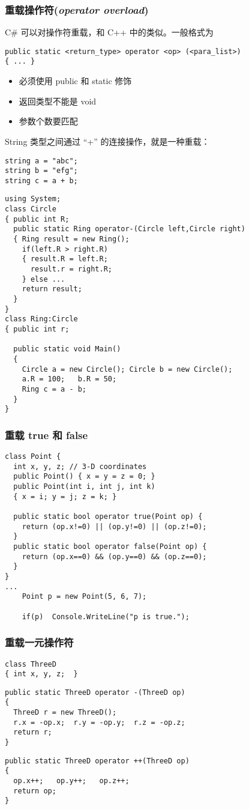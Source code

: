\begin{frame}[fragile]
\frametitle{重载操作符(\textit{operator overload})}
C\# 可以对操作符重载，和 C++ 中的类似。一般格式为
\begin{lstlisting}
public static <return_type> operator <op> (<para_list>)
{ ... }
\end{lstlisting}
\begin{itemize}
\item 必须使用 public 和 static 修饰
\item 返回类型不能是 void
\item 参数个数要匹配
\end{itemize}
String 类型之间通过 ``+'' 的连接操作，就是一种重载：
\begin{lstlisting}
string a = "abc";
string b = "efg";
string c = a + b;
\end{lstlisting}
\end{frame}

\begin{frame}
\begin{lstlisting}
using System;
class Circle
{ public int R;
  public static Ring operator-(Circle left,Circle right)
  { Ring result = new Ring();
    if(left.R > right.R)
    { result.R = left.R;
      result.r = right.R;
    } else ...
    return result;
  }
}
class Ring:Circle
{ public int r;

  public static void Main()
  {
    Circle a = new Circle(); Circle b = new Circle();
    a.R = 100;   b.R = 50;
    Ring c = a - b;
  }
}
\end{lstlisting}
\end{frame}

\begin{frame}[fragile]
\frametitle{重载 true 和 false}
\begin{lstlisting}
class Point {
  int x, y, z; // 3-D coordinates
  public Point() { x = y = z = 0; }
  public Point(int i, int j, int k)
  { x = i; y = j; z = k; }

  public static bool operator true(Point op) {
    return (op.x!=0) || (op.y!=0) || (op.z!=0);
  }
  public static bool operator false(Point op) {
    return (op.x==0) && (op.y==0) && (op.z==0);
  }
}
...
    Point p = new Point(5, 6, 7);

    if(p)  Console.WriteLine("p is true.");
\end{lstlisting}
\end{frame}

\begin{frame}[fragile]
\frametitle{重载一元操作符}
\begin{lstlisting}
class ThreeD
{ int x, y, z;  }
\end{lstlisting}
\medskip
\begin{lstlisting}
public static ThreeD operator -(ThreeD op)
{
  ThreeD r = new ThreeD();
  r.x = -op.x;  r.y = -op.y;  r.z = -op.z;
  return r;
}
\end{lstlisting}
\medskip
\begin{lstlisting}
public static ThreeD operator ++(ThreeD op)
{
  op.x++;   op.y++;   op.z++;
  return op;
}
\end{lstlisting}
\end{frame}

